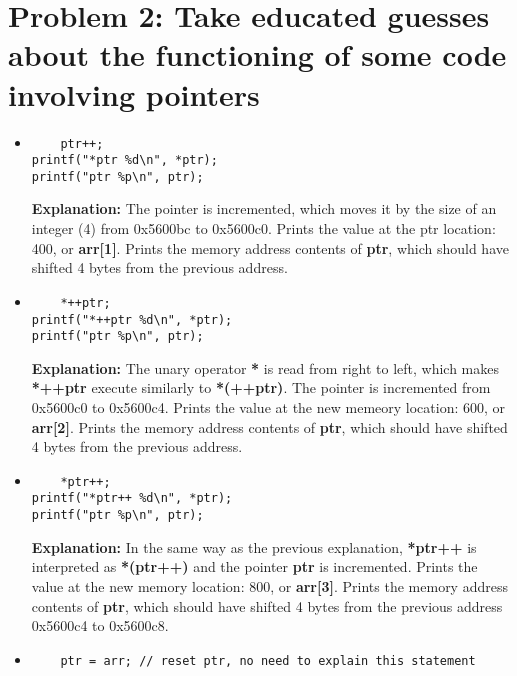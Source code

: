 \documentclass{article}
\begin{document}
\section*{Problem 2: Take educated guesses about the functioning of some code involving pointers}
\begin{itemize}
  \item \begin{lstlisting}
    ptr++;
printf("*ptr %d\n", *ptr);
printf("ptr %p\n", ptr);
  \end{lstlisting}
  \textbf{Explanation:} The pointer is incremented, which moves it by the size of an integer (4) from 0x5600bc to 0x5600c0. Prints the value at the ptr location: 400, or \textbf{arr[1]}. Prints the memory address contents of \textbf{ptr}, which should have shifted 4 bytes from the previous address.
  \item \begin{lstlisting}
    *++ptr;
printf("*++ptr %d\n", *ptr);
printf("ptr %p\n", ptr);
  \end{lstlisting}
  \textbf{Explanation:} The unary operator \textbf{*} is read from right to left, which makes \textbf{*++ptr} execute similarly to \textbf{*(++ptr)}. The pointer is incremented from 0x5600c0 to 0x5600c4. Prints the value at the new memeory location: 600, or \textbf{arr[2]}. Prints the memory address contents of \textbf{ptr}, which should have shifted 4 bytes from the previous address.
  \item \begin{lstlisting}
    *ptr++;
printf("*ptr++ %d\n", *ptr);
printf("ptr %p\n", ptr);
  \end{lstlisting}
  \textbf{Explanation:} In the same way as the previous explanation, \textbf{*ptr++} is interpreted as \textbf{*(ptr++)} and the pointer \textbf{ptr} is incremented. Prints the value at the new memory location: 800, or \textbf{arr[3]}. Prints the memory address contents of \textbf{ptr}, which should have shifted 4 bytes from the previous address 0x5600c4 to 0x5600c8.
  \item \begin{lstlisting}
    ptr = arr; // reset ptr, no need to explain this statement


\end{lstlisting}
\end{itemize}
\end{document}
